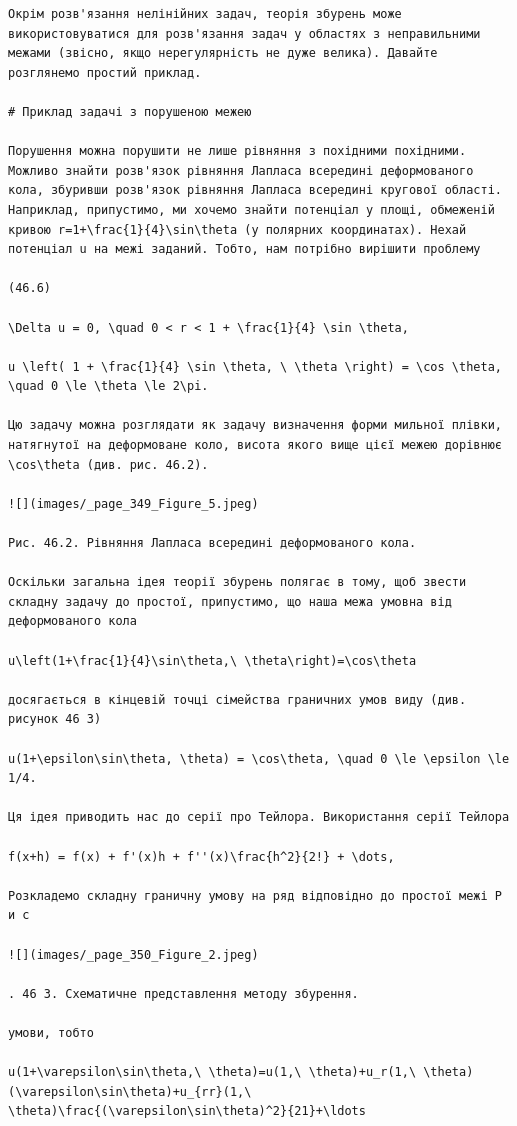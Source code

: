 \documentclass[
  ukrainian,
]{article}
\begin{document}
\begin{verbatim}
Окрім розв'язання нелінійних задач, теорія збурень може використовуватися для розв'язання задач у областях з неправильними межами (звісно, якщо нерегулярність не дуже велика). Давайте розглянемо простий приклад.

# Приклад задачі з порушеною межею

Порушення можна порушити не лише рівняння з похідними похідними. Можливо знайти розв'язок рівняння Лапласа всередині деформованого кола, збуривши розв'язок рівняння Лапласа всередині кругової області. Наприклад, припустимо, ми хочемо знайти потенціал у площі, обмеженій кривою r=1+\frac{1}{4}\sin\theta (у полярних координатах). Нехай потенціал u на межі заданий. Тобто, нам потрібно вирішити проблему

(46.6)

\Delta u = 0, \quad 0 < r < 1 + \frac{1}{4} \sin \theta,

u \left( 1 + \frac{1}{4} \sin \theta, \ \theta \right) = \cos \theta, \quad 0 \le \theta \le 2\pi.

Цю задачу можна розглядати як задачу визначення форми мильної плівки, натягнутої на деформоване коло, висота якого вище цієї межею дорівнює \cos\theta (див. рис. 46.2).

![](images/_page_349_Figure_5.jpeg)

Рис. 46.2. Рівняння Лапласа всередині деформованого кола.

Оскільки загальна ідея теорії збурень полягає в тому, щоб звести складну задачу до простої, припустимо, що наша межа умовна від деформованого кола

u\left(1+\frac{1}{4}\sin\theta,\ \theta\right)=\cos\theta

досягається в кінцевій точці сімейства граничних умов виду (див. рисунок 46 3)

u(1+\epsilon\sin\theta, \theta) = \cos\theta, \quad 0 \le \epsilon \le 1/4.

Ця ідея приводить нас до серії про Тейлора. Використання серії Тейлора

f(x+h) = f(x) + f'(x)h + f''(x)\frac{h^2}{2!} + \dots,

Розкладемо складну граничну умову на ряд відповідно до простої межі Р и с

![](images/_page_350_Figure_2.jpeg)

. 46 3. Схематичне представлення методу збурення.

умови, тобто

u(1+\varepsilon\sin\theta,\ \theta)=u(1,\ \theta)+u_r(1,\ \theta)(\varepsilon\sin\theta)+u_{rr}(1,\ \theta)\frac{(\varepsilon\sin\theta)^2}{21}+\ldots


\end{verbatim}
\end{document}
